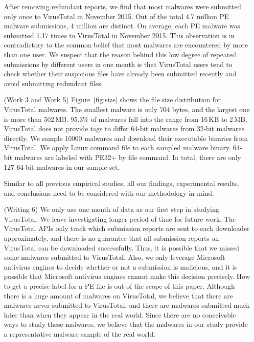 After removing redundant reports, we find that most malwares were submitted only once to VirusTotal in November 2015. 
Out of the total 4.7 million PE malware submissions, 4 million are distinct. 
On average, each PE malware was submitted 1.17 times to VirusTotal in November 2015. 
This observation is in contradictory to the common belief that most malwares are encountered by more than one user.
We suspect that the reason behind this low degree of repeated submissions by different users in one month
is that VirusTotal users
tend to check whether their suspicious files have already been submitted recently
and avoid submitting redundant files.

{\color{red} (Work 3 and Work 5)
Figure~\ref{fig:size} shows the file size distribution for VirusTotal malwares. 
The smallest malware is only 704 bytes, and the largest one is more than 502\,MB. 
95.3\% of malwares fall into the range from 16\,KB to 2\,MB. 
VirusTotal does not provide tags to differ 64-bit malwares from 32-bit malwares directly. 
We sample 10000 malwares and download their executable binaries from VirusTotal.
We apply Linux command file to each sampled malware binary. 
64-bit malwares are labeled with PE32+ by file command. 
In total, there are only 127 64-bit malwares in our sample set. 
}

Similar to all previous empirical studies, all our findings, experimental results, 
and conclusions need to be considered with our methodology in mind. 

{\color{red} (Writing 6)
We only use one month of data as our first step in studying VirusTotal. 
We leave investigating longer period of time for future work. 
}
The VirusTotal APIs only track which submission reports are sent to each downloader approximately, 
and there is no guarantee that all submission reports on VirusTotal can be downloaded successfully. 
Thus, it is possible that we missed some malwares submitted to VirusTotal. 
Also, we only leverage Microsoft antivirus engines to decide whether or not a submission is malicious, 
and it is possible that Microsoft antivirus engines cannot make this decision precisely. 
How to get a precise label for a PE file is out of the scope of this paper.  
Although there is a huge amount of malwares on VirusTotal, we believe that there are malwares never submitted to VirusTotal, 
and there are malwares submitted much later than when they appear in the real world.
Since there are no conceivable ways to study these malwares,
we believe that the malwares in our study provide a representative malware sample of the real world. 



